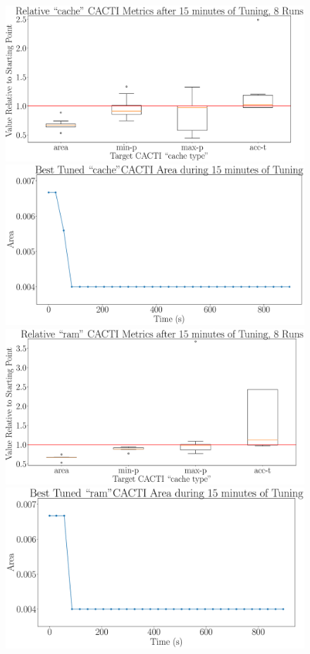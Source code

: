 \documentclass[12pt, a4paper]{article}
\begin{document}
\begin{figure}[htpb]
    \centering
    \begin{minipage}{.48\textwidth}
        \centering
        \includegraphics[width=.8\textwidth]{target_area_900_cache}
    \end{minipage}%
    \begin{minipage}{.48\textwidth}
        \centering
        \includegraphics[width=.8\textwidth]{target_area_900_cache_best}
    \end{minipage}%

    \begin{minipage}{.48\textwidth}
        \centering
        \includegraphics[width=.8\textwidth]{target_area_900_ram}
    \end{minipage}%
    \begin{minipage}{.48\textwidth}
        \centering
        \includegraphics[width=.8\textwidth]{target_area_900_ram_best}
    \end{minipage}%


\end{figure}
\end{document}
